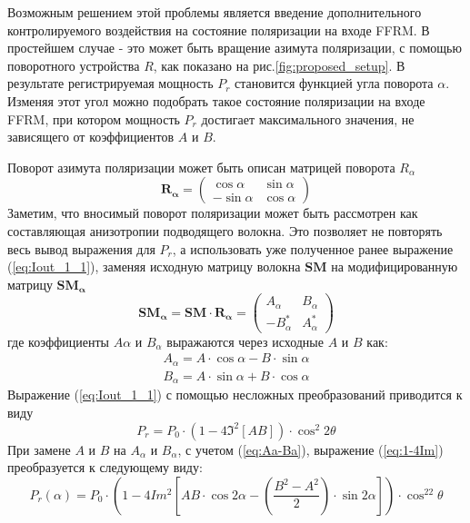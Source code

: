 \documentclass{article}
\begin{document}
Возможным решением этой проблемы является введение дополнительного контролируемого воздействия на состояние поляризации на входе FFRM.
В простейшем случае - это может быть вращение азимута поляризации, с помощью поворотного устройства $R$, как показано на рис.\ref{fig:proposed_setup}.
В результате регистрируемая мощность $P_r$ становится функцией угла поворота $\alpha$.
Изменяя этот угол можно подобрать такое состояние поляризации на входе FFRM, при котором мощность $P_r$ достигает максимального значения, не зависящего от коэффициентов $A$ и $B$.

Поворот азимута поляризации может быть описан матрицей поворота $R_\alpha$
\begin{equation}
	\label{eq:rotMatrix}
	\bm{R_\alpha} = 
	\begin{pmatrix}
		\cos\alpha & \sin\alpha \\
		-\sin\alpha & \cos\alpha
	\end{pmatrix}	
\end{equation} 
Заметим, что вносимый поворот поляризации может быть рассмотрен как составляющая анизотропии подводящего волокна.
Это позволяет не повторять весь вывод выражения для $P_r$, а использовать уже полученное ранее выражение (\ref{eq:Iout_1_1}), заменяя исходную матрицу волокна $\bm{SM}$ на модифицированную матрицу $\bm{SM_\alpha}$    
\begin{equation}
    \bm{SM_\alpha} = \bm{SM}\cdot\bm{R_\alpha}= 
    \begin{pmatrix}
		A_\alpha & B_\alpha \\
		-B^*_\alpha & A^*_\alpha
    \end{pmatrix}	
\end{equation}
где коэффициенты $A\alpha$ и $B_\alpha$ выражаются через исходные $A$ и $B$ как:
\begin{equation}
   \label{eq:Aa-Ba}
    \begin{aligned}
        A_\alpha = A\cdot\cos\alpha - B\cdot\sin\alpha \\
        B_\alpha = A\cdot\sin\alpha + B\cdot\cos\alpha
    \end{aligned}
\end{equation}
Выражение (\ref{eq:Iout_1_1}) с помощью несложных преобразований приводится к виду 
\begin{equation}
    \label{eq:1-4Im}
    P_{r} = P_0 \cdot \left(1-4\Im^2[AB] \right) \cdot \cos^2 2 \theta
\end{equation}
При замене $A$ и $B$ на $A_\alpha$ и $B_\alpha$, с учетом (\ref{eq:Aa-Ba}), выражение (\ref{eq:1-4Im}) преобразуется к следующему виду:
\begin{equation}
    \label{eq:Pr_our}
    P_r(\alpha)=P_0\cdot\left( 1-4Im^2\left[A B\cdot \cos2\alpha -\left( \frac{B^2-A^2}{2} \right)\cdot\sin2\alpha\right] \right)\cdot\cos^22\theta
\end{equation}
\end{document}

